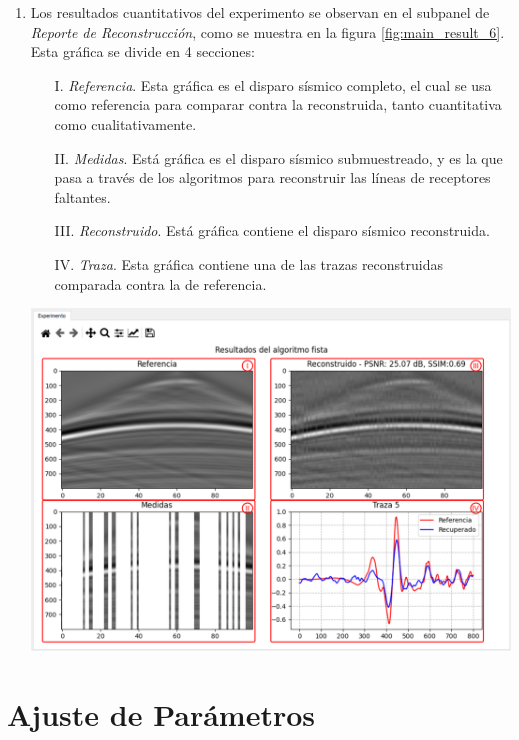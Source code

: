 \documentclass[12pt,twoside,letter]{ol-softwaremanual}
\newenvironment{Figure}
  {\par\medskip\noindent\minipage{\linewidth}}
  {\endminipage\par\medskip}
\begin{document}
\begin{enumerate}
	\item Los resultados cuantitativos del experimento se observan en el subpanel de \emph{Reporte de Reconstrucción}, como se muestra en la figura \ref{fig:main_result_6}. Esta gráfica se divide en 4 secciones:
	
	\begin{itemize}[leftmargin=0.5in]
		\setlength\itemsep{0em}
		\item[I.]  \textit{Referencia}. Esta gráfica es el disparo sísmico completo, el cual se usa como referencia para comparar contra la reconstruida, tanto cuantitativa como cualitativamente.		
		\item[II.] \textit{Medidas}. Está gráfica es el disparo sísmico submuestreado, y es la que pasa a través de los algoritmos para reconstruir las líneas de receptores faltantes.		
		\item[III.] \textit{Reconstruido}. Está gráfica contiene el disparo sísmico reconstruida.		
		\item[IV.] \textit{Traza}. Esta gráfica contiene una de las trazas reconstruidas comparada contra la de referencia.		
	\end{itemize}

	\begin{Figure}
		\centering
		\includegraphics[width=1\linewidth]{main-result-6.png}
		\label{fig:main_result_6}
	\end{Figure}

\end{enumerate}

\section{Ajuste de Parámetros}
\end{document}
